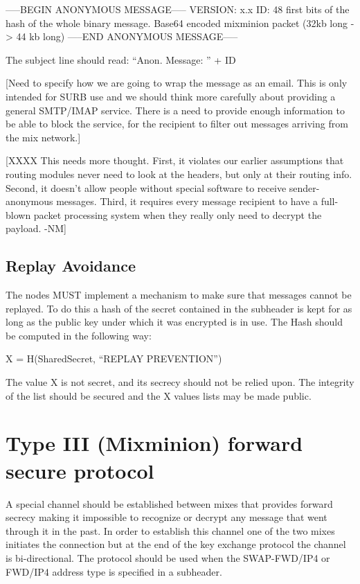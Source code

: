 -----BEGIN ANONYMOUS MESSAGE-----
VERSION: x.x
ID: 48 first bits of the hash of the whole binary message.
Base64 encoded mixminion packet (32kb long -> 44 kb long)
-----END ANONYMOUS MESSAGE-----

The subject line should read: ``Anon. Message: '' + ID

[Need to specify how we are going to wrap the message
 as an email. This is only intended for SURB use and
 we should think more carefully about providing a 
 general SMTP/IMAP service.
 There is a need to provide enough information to be 
 able to block the service, for the recipient to
 filter out messages arriving from the mix network.]

[XXXX This needs more thought.  First, it violates our earlier
      assumptions that routing modules never need to look at the
      headers, but only at their routing info.  Second, it doesn't
      allow people without special software to receive
      sender-anonymous messages.  Third, it requires every message
      recipient to have a full-blown packet processing system when
      they really only need to decrypt the payload.  -NM]

\subsection{Replay Avoidance}

The nodes MUST implement a mechanism to make sure that messages cannot
be replayed. To do this a hash of the secret contained in the
subheader is kept for as long as the public key under which it was
encrypted is in use. The Hash should be computed in the following way:

X = H(SharedSecret, ``REPLAY PREVENTION'')

The value X is not secret, and its secrecy should not be relied upon.
The integrity of the list should be secured and the X values lists may
be made public.

\section{Type III (Mixminion) forward secure protocol}

A special channel should be established between mixes that provides
forward secrecy making it impossible to recognize or decrypt any
message that went through it in the past. In order to establish this
channel one of the two mixes initiates the connection but at the end
of the key exchange protocol the channel is bi-directional. The
protocol should be used when the SWAP-FWD/IP4 or FWD/IP4 address type
is specified in a subheader.

